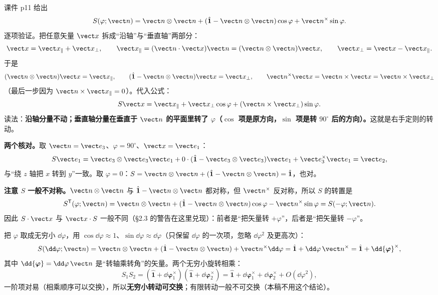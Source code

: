 \documentclass[11pt]{ctexart}
\newcommand{\ten}[1]{\mathbf{#1}}
\newcommand{\unitd}{\hat{\ten{1}}}
\let\origsubhdr\subhdr
\renewcommand{\subhdr}[1]{\par\needspace{3\baselineskip}\origsubhdr{#1}}
\begin{document}
课件 p11 给出
\[
S(\varphi;\vect n)=\vect n\otimes\vect n+(\unitd-\vect n\otimes\vect n)\cos\varphi+\vect n^{\times}\sin\varphi .
\]
逐项验证。把任意矢量 $\vect x$ 拆成“沿轴”与“垂直轴”两部分：
\[
\vect x=\vect x_\parallel+\vect x_\perp,\qquad
\vect x_\parallel=(\vect n\cdot\vect x)\vect n=(\vect n\otimes\vect n)\vect x,\qquad
\vect x_\perp=\vect x-\vect x_\parallel .
\]
于是
\[
(\vect n\otimes\vect n)\vect x=\vect x_\parallel,\qquad
(\unitd-\vect n\otimes\vect n)\vect x=\vect x_\perp,\qquad
\vect n^{\times}\vect x=\vect n\times\vect x=\vect n\times\vect x_\perp
\]
（最后一步因为 $\vect n\times\vect x_\parallel=0$）。代入公式：
\[
S\vect x=\vect x_\parallel+\vect x_\perp\cos\varphi+(\vect n\times\vect x_\perp)\sin\varphi .
\]
读法：\textbf{沿轴分量不动；垂直轴分量在垂直于 $\vect n$ 的平面里转了 $\varphi$（$\cos$ 项是原方向，$\sin$ 项是转 $90^\circ$ 后的方向）。}这就是右手定则的转动。

\textbf{两个核对。}取 $\vect n=\vect e_3$、$\varphi=90^\circ$、$\vect x=\vect e_1$：
\[
S\vect e_1=\vect e_3\otimes\vect e_3\vect e_1+0\cdot(\unitd-\vect e_3\otimes\vect e_3)\vect e_1+\vect e_3^{\times}\vect e_1=\vect e_2,
\]
与“绕 $z$ 轴把 $x$ 转到 $y$”一致。取 $\varphi=0$：$S=\vect n\otimes\vect n+(\unitd-\vect n\otimes\vect n)=\unitd$，也对。

\textbf{注意 $S$ 一般不对称。}$\vect n\otimes\vect n$ 与 $\unitd-\vect n\otimes\vect n$ 都对称，但 $\vect n^{\times}$ 反对称，所以 $S$ 的转置是
\[
S^{\mathsf T}(\varphi;\vect n)=\vect n\otimes\vect n+(\unitd-\vect n\otimes\vect n)\cos\varphi-\vect n^{\times}\sin\varphi=S(-\varphi;\vect n).
\]
因此 $S\cdot\vect x$ 与 $\vect x\cdot S$ 一般不同（§2.3 的警告在这里兑现）：前者是“把矢量转 $+\varphi$”，后者是“把矢量转 $-\varphi$”。


把 $\varphi$ 取成无穷小 $\dd\varphi$，用 $\cos\dd\varphi\approx1$、$\sin\dd\varphi\approx\dd\varphi$（只保留 $\dd\varphi$ 的一次项，忽略 $\dd\varphi^2$ 及更高次）：
\[
S(\dd\varphi;\vect n)=\vect n\otimes\vect n+(\unitd-\vect n\otimes\vect n)+\vect n^{\times}\dd\varphi
=\unitd+\dd\varphi\,\vect n^{\times}=\unitd+\dd{\boldsymbol\varphi}^{\times},
\]
其中 $\dd{\boldsymbol\varphi}=\dd\varphi\,\vect n$ 是“转轴乘转角”的矢量。两个无穷小旋转相乘：
\[
S_1S_2=(\unitd+\dd{\boldsymbol\varphi}_1^{\times})(\unitd+\dd{\boldsymbol\varphi}_2^{\times})
=\unitd+\dd{\boldsymbol\varphi}_1^{\times}+\dd{\boldsymbol\varphi}_2^{\times}+O(\dd\varphi^2),
\]
一阶项对易（相乘顺序可以交换），所以\textbf{无穷小转动可交换}；有限转动一般不可交换（本稿不用这个结论）。
\end{document}
